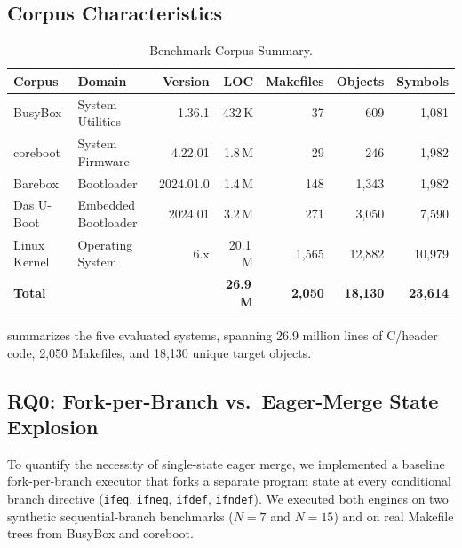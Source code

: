 \documentclass[acmsmall,screen,review]{acmart}
\begin{document}
\subsection{Corpus Characteristics}
\label{sec:eval:corpus}

\begin{table}[t]
\centering
\footnotesize
\setlength{\tabcolsep}{4pt}
\caption{Benchmark Corpus Summary.}
\label{tab:rq1}
\begin{tabular}{llrrrrr}
\toprule
\textbf{Corpus} & \textbf{Domain} & \textbf{Version} & \textbf{LOC} & \textbf{Makefiles} & \textbf{Objects} & \textbf{Symbols} \\
\midrule
BusyBox & System Utilities & 1.36.1 & 432\,K & 37 & 609 & 1,081 \\
coreboot & System Firmware & 4.22.01 & 1.8\,M & 29 & 246 & 1,982 \\
Barebox & Bootloader & 2024.01.0 & 1.4\,M & 148 & 1,343 & 1,982 \\
Das U-Boot & Embedded Bootloader & 2024.01 & 3.2\,M & 271 & 3,050 & 7,590 \\
Linux Kernel & Operating System & 6.x & 20.1\,M & 1,565 & 12,882 & 10,979 \\
\midrule
\textbf{Total} & & & \textbf{26.9\,M} & \textbf{2,050} & \textbf{18,130} & \textbf{23,614} \\
\bottomrule
\end{tabular}
\end{table}

 summarizes the five evaluated systems, spanning 26.9 million lines of C/header code, 2,050 Makefiles, and 18,130 unique target objects.

\subsection{RQ0: Fork-per-Branch vs.\ Eager-Merge State Explosion}
\label{sec:eval:rq0}

To quantify the necessity of single-state eager merge, we implemented a baseline fork-per-branch executor that forks a separate program state at every conditional branch directive (\texttt{ifeq}, \texttt{ifneq}, \texttt{ifdef}, \texttt{ifndef}). We executed both engines on two synthetic sequential-branch benchmarks ($N=7$ and $N=15$) and on real Makefile trees from BusyBox and coreboot.
\end{document}
